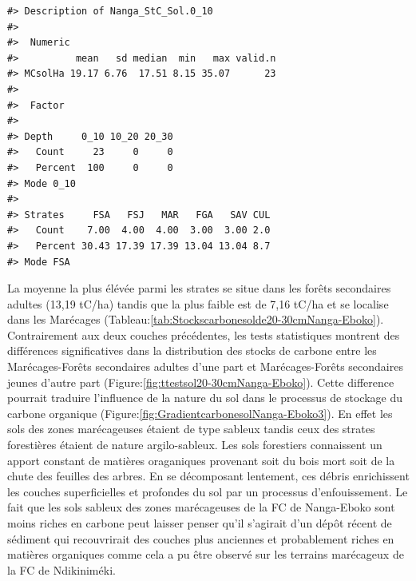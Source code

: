 \documentclass[
  12pt,
  a4paper,
  extrafontsizes,
  onecolumn,
  openright]{book}
\theoremstyle{definition}
\theoremstyle{definition}
\theoremstyle{definition}
\theoremstyle{definition}
\theoremstyle{remark}
\begin{document}
\begin{verbatim}
#> Description of Nanga_StC_Sol.0_10
#> 
#>  Numeric 
#>          mean   sd median  min   max valid.n
#> MCsolHa 19.17 6.76  17.51 8.15 35.07      23
#> 
#>  Factor 
#>          
#> Depth     0_10 10_20 20_30
#>   Count     23     0     0
#>   Percent  100     0     0
#> Mode 0_10 
#>          
#> Strates     FSA   FSJ   MAR   FGA   SAV CUL
#>   Count    7.00  4.00  4.00  3.00  3.00 2.0
#>   Percent 30.43 17.39 17.39 13.04 13.04 8.7
#> Mode FSA
\end{verbatim}

La moyenne la plus élévée parmi les strates se situe dans les forêts secondaires adultes (13,19 tC/ha) tandis que la plus faible est de 7,16 tC/ha et se localise dans les Marécages (Tableau:\ref{tab:Stockscarbonesolde20-30cmNanga-Eboko}). Contrairement aux deux couches précédentes, les tests statistiques montrent des différences significatives dans la distribution des stocks de carbone entre les Marécages-Forêts secondaires adultes d'une part et Marécages-Forêts secondaires jeunes d'autre part (Figure:\ref{fig:ttestsol20-30cmNanga-Eboko}). Cette difference pourrait traduire l'influence de la nature du sol dans le processus de stockage du carbone organique (Figure:\ref{fig:GradientcarbonesolNanga-Eboko3}). En effet les sols des zones marécageuses étaient de type sableux tandis ceux des strates forestières étaient de nature argilo-sableux. Les sols forestiers connaissent un apport constant de matières oraganiques provenant soit du bois mort soit de la chute des feuilles des arbres. En se décomposant lentement, ces débris enrichissent les couches superficielles et profondes du sol par un processus d'enfouissement. Le fait que les sols sableux des zones marécageuses de la FC de Nanga-Eboko sont moins riches en carbone peut laisser penser qu'il s'agirait d'un dépôt récent de sédiment qui recouvrirait des couches plus anciennes et probablement riches en matières organiques comme cela a pu être observé sur les terrains marécageux de la FC de Ndikiniméki.
\end{document}
